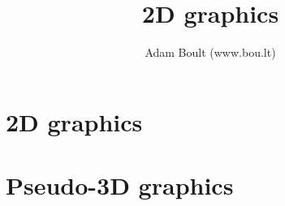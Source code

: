 \documentclass[oneside]{book}
\begin{document}
\author{Adam Boult (www.bou.lt)}
\title{2D graphics}
\maketitle

\setcounter{tocdepth}{0}
\tableofcontents



\part{2D graphics}





\part{Pseudo-3D graphics}


\end{document}
